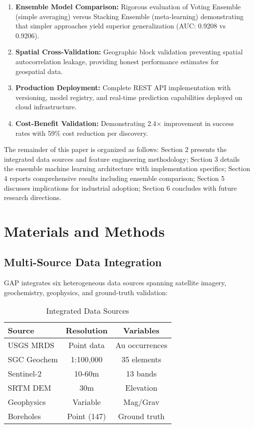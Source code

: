 \documentclass[12pt,a4paper]{article}
\begin{document}
\begin{enumerate}
    \item \textbf{Ensemble Model Comparison:} Rigorous evaluation of Voting Ensemble (simple averaging) versus Stacking Ensemble (meta-learning) demonstrating that simpler approaches yield superior generalization (AUC: 0.9208 vs 0.9206).
    
    \item \textbf{Spatial Cross-Validation:} Geographic block validation preventing spatial autocorrelation leakage, providing honest performance estimates for geospatial data.
    
    \item \textbf{Production Deployment:} Complete REST API implementation with versioning, model registry, and real-time prediction capabilities deployed on cloud infrastructure.
    
    \item \textbf{Cost-Benefit Validation:} Demonstrating 2.4$\times$ improvement in success rates with 59\% cost reduction per discovery.
\end{enumerate}

The remainder of this paper is organized as follows: Section 2 presents the integrated data sources and feature engineering methodology; Section 3 details the ensemble machine learning architecture with implementation specifics; Section 4 reports comprehensive results including ensemble comparison; Section 5 discusses implications for industrial adoption; Section 6 concludes with future research directions.

\section{Materials and Methods}

\subsection{Multi-Source Data Integration}

GAP integrates six heterogeneous data sources spanning satellite imagery, geochemistry, geophysics, and ground-truth validation:

\begin{table}[h]
\centering
\caption{Integrated Data Sources}
\label{tab:data_sources}
\begin{tabular}{@{}lcc@{}}
\toprule
\textbf{Source} & \textbf{Resolution} & \textbf{Variables} \\
\midrule
USGS MRDS & Point data & Au occurrences \\
SGC Geochem & 1:100,000 & 35 elements \\
Sentinel-2 & 10-60m & 13 bands \\
SRTM DEM & 30m & Elevation \\
Geophysics & Variable & Mag/Grav \\
Boreholes & Point (147) & Ground truth \\
\bottomrule
\end{tabular}
\end{table}
\end{document}
